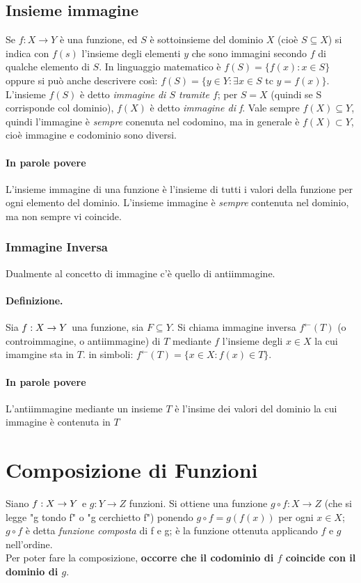 \documentclass[12pt, a4paper, openany]{book}
\begin{document}
\subsection*{Insieme immagine}
Se $f: X \rightarrow Y$ è una funzione, ed $S$ è sottoinsieme del dominio $X$ (cioè $S \subseteq X$) si indica con $f(s)$ l'insieme degli elementi $y$ che sono immagini secondo $f$ di qualche elemento di $S$.
In linguaggio matematico è $f(S) = \{ f(x) : x \in S\}$ oppure si può anche descrivere così: $f(S) = \{y \in Y : \exists x \in S \text{ tc } y = f(x)\}$.
L'insieme $f(S)$ è detto \emph{immagine di $S$ tramite $f$}; per $S = X$ (quindi se S corrisponde col dominio), $f(X)$ è detto \emph{immagine di f}. 
Vale sempre $f(X) \subseteq Y$, quindi l'immagine è \emph{sempre} conenuta nel codomino, ma in generale è $f(X) \subset Y$, cioè immagine e codominio sono diversi.
\paragraph{In parole povere} L'insieme immagine di una funzione è l'insieme di tutti i valori della funzione per ogni elemento del dominio.
L'insieme immagine è \emph{sempre} contenuta nel dominio, ma non sempre vi coincide.

\subsubsection{Immagine Inversa}
Dualmente al concetto di immagine c'è quello di antiimmagine.
\paragraph{Definizione. }Sia $f: X \rightarrow Y $ una funzione, sia $F \subseteq Y$.
Si chiama immagine inversa $f^\leftarrow(T)$ (o controimmagine, o antiimmagine) di $T$ mediante $f$ l'insieme degli $x \in X$ la cui imamgine sta in $T$.
in simboli: $f^\leftarrow(T) = \{ x \in X : f(x) \in T\}$.
\paragraph{In parole povere} L'antiimmagine mediante un insieme $T$ è l'insime dei valori del dominio la cui immagine è contenuta in $T$


\section{Composizione di Funzioni} 
Siano $f: X \rightarrow Y$ e $g: Y \rightarrow Z$ funzioni.
Si ottiene una funzione $g \circ f : X \rightarrow Z $ (che si legge "g tondo f" o "g cerchietto f") ponendo $g \circ f = g(f(x))$ per ogni $x \in X$;
$g \circ f$ è detta \emph{funzione composta} di f e g; è la funzione ottenuta applicando $f$ e $g$ nell'ordine.
\\Per poter fare la composizione, \textbf{occorre che il codominio di $f$ coincide con il dominio di $g$}.
\end{document}
